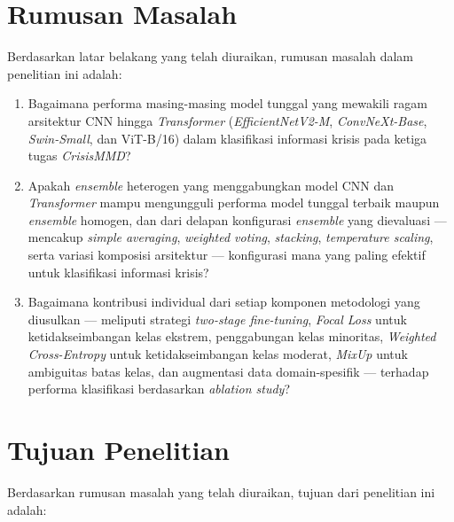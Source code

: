 \section{Rumusan Masalah} \label{I.RumusanMasalah}
Berdasarkan latar belakang yang telah diuraikan, rumusan masalah dalam
penelitian ini adalah: \par

\begin{enumerate}[noitemsep]
    \item Bagaimana performa masing-masing model tunggal yang mewakili
    ragam arsitektur CNN hingga \textit{Transformer}
    (\textit{EfficientNetV2-M}, \textit{ConvNeXt-Base},
    \textit{Swin-Small}, dan ViT-B/16) dalam klasifikasi informasi
    krisis pada ketiga tugas \textit{CrisisMMD}?

    \item Apakah \textit{ensemble} heterogen yang menggabungkan model
    CNN dan \textit{Transformer} mampu mengungguli performa model
    tunggal terbaik maupun \textit{ensemble} homogen, dan dari delapan
    konfigurasi \textit{ensemble} yang dievaluasi — mencakup
    \textit{simple averaging}, \textit{weighted voting},
    \textit{stacking}, \textit{temperature scaling}, serta variasi
    komposisi arsitektur — konfigurasi mana yang paling efektif untuk
    klasifikasi informasi krisis?

    \item Bagaimana kontribusi individual dari setiap komponen
    metodologi yang diusulkan — meliputi strategi \textit{two-stage
    fine-tuning}, \textit{Focal Loss} untuk ketidakseimbangan kelas
    ekstrem, penggabungan kelas minoritas, \textit{Weighted
    Cross-Entropy} untuk ketidakseimbangan kelas moderat, \textit{MixUp}
    untuk ambiguitas batas kelas, dan augmentasi data domain-spesifik
    — terhadap performa klasifikasi berdasarkan \textit{ablation study}?
\end{enumerate}


\section{Tujuan Penelitian} \label{I.Tujuan}
Berdasarkan rumusan masalah yang telah diuraikan, tujuan dari penelitian
ini adalah: \par

